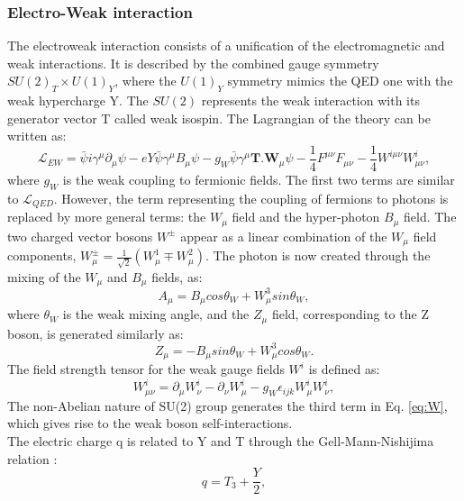 \subsubsection{Electro-Weak interaction}
The electroweak interaction consists of a unification of the electromagnetic and weak interactions. It is described by the combined gauge symmetry $SU(2)_{T}\times U(1)_{Y}$, where the $U(1)_{Y}$ symmetry mimics the QED one with the weak hypercharge Y. The $SU(2)$ represents the weak interaction with its generator vector T called weak isospin. The Lagrangian of the theory can be written as: 
\begin{equation}
    \mathcal{L}_{EW} = \bar{\psi}i\gamma^\mu\partial_\mu\psi -eY\bar{\psi}\gamma^{\mu}B_{\mu}\psi-g_{W}\bar{\psi}\gamma^{\mu}\textbf{T.W$_\mu$}\psi
    -\frac{1}{4}F^{\mu\nu}F_{\mu\nu} - \frac{1}{4}W^{i\mu\nu}W^i_{\mu\nu},
\end{equation}
where $g_{W}$ is the weak coupling to fermionic fields. The first two terms are similar to $\mathcal{L}_{QED}$. However, the term representing the coupling of fermions to photons is replaced by more general terms: the $W_{\mu}$ field and the hyper-photon $B_{\mu}$ field. The two charged vector bosons $W^\pm$ appear as a linear combination of the $W_{\mu}$ field components, $W^{\pm}_{\mu} = \frac{1}{\sqrt{2}}(W^1_{\mu}\mp W^2_{\mu})$. The photon is now created through the mixing of the $W_{\mu}$ and $B_{\mu}$ fields, as:
\begin{equation}
    A_{\mu} = B_{\mu}cos\theta_{W} + W^3_{\mu}sin\theta_{W},
\end{equation}
where $\theta_{W}$ is the weak mixing angle, and the $Z_{\mu}$ field, corresponding to the Z boson, is generated similarly as: 
\begin{equation}
     Z_{\mu} = -B_{\mu}sin\theta_{W} + W^3_{\mu}cos\theta_{W}.
\end{equation}
The field strength tensor for the weak gauge fields $W^i$ is defined as:
\begin{equation}
    W^{i}_{\mu\nu} = \partial_{\mu}W^i_{\nu} - \partial_{\nu}W^i_{\mu} - g_{W}\epsilon_{ijk}W^i_{\mu}W^i_{\nu},
    \label{eq:W}
\end{equation}
The non-Abelian nature of SU(2) group generates the third term in Eq. \ref{eq:W}, which gives rise to the weak boson self-interactions. \\
The electric charge q is related to Y and T through the Gell-Mann-Nishijima relation \cite{Gell}:
\begin{equation}
    q = T_3 + \frac{Y}{2},
\end{equation}
